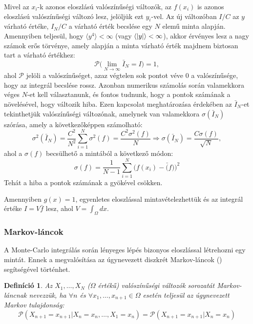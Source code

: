 \documentclass[11pt,a4paper]{article}
\numberwithin{equation}{subsection}
\numberwithin{figure}{section}
\newtheorem{definition}{Definíció}[section]
\begin{document}
Mivel az $x_i$-k azonos eloszlású valószínűségi változók, az $f(x_i)$ is azonos eloszlású valószínűségi változó lesz, jelöljük ezt $y_i$-vel. Az új változóban $I/C$ az $y$ várható értéke, $I_N/C$ a várható érték becslése egy $N$ elemű minta alapján. Amennyiben teljesül, hogy $\langle y^4\rangle<\infty$ (vagy $\langle \abs{y}\rangle<\infty$), akkor érvényes lesz a nagy számok erős törvénye, amely alapján a minta várható érték majdnem biztosan tart a várható értékhez:
\begin{equation}
\mathcal{P}\Big(\lim_{N\rightarrow\infty}\bar{I}_N=I\Big)=1,
\end{equation}
ahol $\mathcal{P}$ jelöli a valószínűséget, azaz végtelen sok pontot véve $0$ a valószínűsége, hogy az integrál becslése rossz. Azonban numerikus számolás során valamekkora véges $N$-et kell választanunk, és fontos tudnunk, hogy a pontok számának a növelésével, hogy változik hiba. Ezen kapcsolat meghatározása érdekében az $\bar{I}_{N}$-et tekinthetjük valószínűségi változónak, amelynek van valamekkora $\sigma({\bar{I}_N})$ szórása, amely a következőképpen számolható:
\begin{equation}
\sigma^2({\bar{I}_N})=\frac{C^2}{N^2}\sum_{i=1}^N\sigma^2(f)=\frac{C^2\sigma^2(f)}{N}\Longrightarrow \sigma(\bar{I}_N)=\frac{C\sigma(f)}{\sqrt{N}},
\end{equation}
ahol a $\sigma(f)$ becsülhető a mintából a következő módon:
\begin{equation}
\sigma(f)=\frac{1}{N-1}\sum_{i=1}^N\big(f(x_i)-\bar(f)\big)^2
\end{equation}
Tehát a hiba a pontok számának a gyökével csökken.

Amennyiben $g(x)=1$, egyenletes eloszlással mintavételezhettük és az integrál értéke $I=V\bar{f}$ lesz, ahol $V=\int_\Omega dx$.

\subsubsection{Markov-láncok}

A Monte-Carlo integrálás során lényeges lépés bizonyos eloszlással létrehozni egy mintát. Ennek a megvalósítása az úgynevezett diszkrét Markov-láncok (\cite{norris1998markov}) segítségével történhet. 

\begin{definition}
Az $X_1,\dots,X_N$ ($\Omega$ értékű) valószínűségi változók sorozatát Markov-láncnak nevezzük, ha $\forall n$ és $\forall x_1,\dots,x_{n+1}\in\Omega$ esetén teljesül az úgynevezett Markov tulajdonság:
\begin{equation}
\mathcal{P}(X_{n+1}=x_{n+1}|X_n=x_n,\dots,X_1=x_n)=\mathcal{P}(X_{n+1}=x_{n+1}|X_n=x_n)
\end{equation}
\end{definition}
\end{document}
